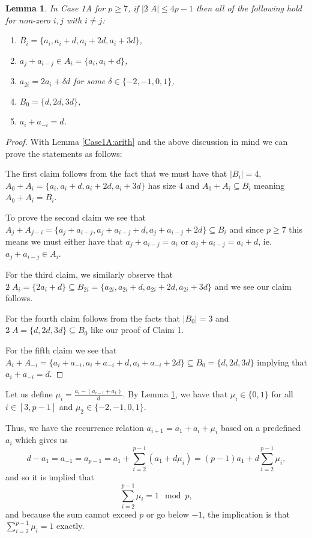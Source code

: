 \documentclass[a4paper, 12pt]{article}\usepackage[english]{babel}
\newtheorem{lem}[thm]{Lemma}
\newcommand{\<}{\langle}
\begin{document}
\begin{lem}
\label{Case1A:BuildFor}
    In Case 1A for $p\geq 7$, if $|2\hat{\;}A|\leq 4p-1$ then all of the following hold for non-zero $i,j$ with $i\neq j$:
    \begin{enumerate}
        \item $B_i=\{a_i,a_i+d,a_i+2d,a_i+3d\}$,
        \item $a_j+a_{i-j}\in A_i=\{a_i,a_i+d\}$,
        \item $a_{2i}=2a_i+\delta d$ for some $\delta\in\{-2,-1,0,1\}$,
        \item $B_0=\{d,2d,3d\}$,
        \item $a_i+a_{-i}=d$.
    \end{enumerate}
\end{lem}
 \begin{proof}
With Lemma \ref{Case1A:arith} and the above discussion in mind we can prove the statements as follows: 
 
     The first claim follows from the fact that we must have that $|B_i|=4$, $A_0+A_i=\{a_i,a_i+d,a_i+2d,a_i+3d\}$ has size $4$ and $A_0+A_i\subseteq B_i$ meaning $A_0+A_i=B_i$.

     To prove the second claim we see that $A_{j}+A_{j-i}=\{a_{j}+a_{i-j},a_{j}+a_{i-j}+d,a_{j}+a_{i-j}+2d\}\subseteq B_i$ and since $p\geq 7$ this means we must either have that $a_{j}+a_{i-j}=a_i$ or $a_{j}+a_{i-j}=a_i+d$, ie. $a_{j}+a_{i-j}\in A_i$.

     For the third claim, we similarly observe that $2\hat{\;}A_{i}=\{2a_i+d\}\subseteq B_{2i}=\{a_{2i},a_{2i}+d,a_{2i}+2d,a_{2i}+3d\}$ and we see our claim follows.

     For the fourth claim follows from the facts that $|B_0|=3$ and $2\hat{\;}A=\{d,2d,3d\}\subseteq B_0$ like our proof of Claim 1.

     For the fifth claim we see that $A_i+A_{-i}=\{a_i+a_{-i},a_i+a_{-i}+d,a_i+a_{-i}+2d\}\subseteq B_0=\{d,2d,3d\}$ implying that $a_i+a_{-i}=d$. 
 \end{proof}


Let us define $\mu_i=\frac{a_{i}-(a_{i-1}+a_1)}{d}$. By Lemma \ref{Case1A:BuildFor}, we have that $\mu_{i}\in\{0,1\}$ for all $i\in[3,p-1]$ and $\mu_2\in\{-2,-1,0,1\}$.

Thus, we have the recurrence relation $a_{i+1}=a_1+a_i+\mu_i$ based on a predefined $a_i$ which gives us   \[d-a_1=a_{-1}=a_{p-1}=a_1+\sum_{i=2}^{p-1}(a_1+d\mu_i)=(p-1)a_1+d\sum_{i=2}^{p-1}\mu_i,\] and so it is implied that \[\sum_{i=2}^{p-1}\mu_i=1 \mod p,\] and because the sum cannot exceed $p$ or go below $-1$, the implication is that $\sum_{i=2}^{p-1}\mu_i=1$ exactly.
\end{document}
